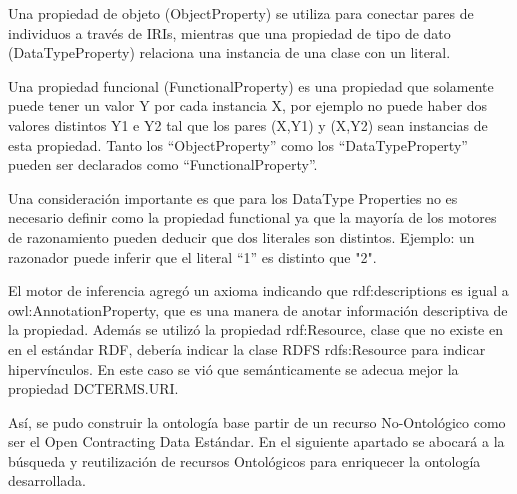 Una propiedad de objeto (ObjectProperty) se utiliza para conectar pares de individuos a través de IRIs, mientras que una propiedad de tipo de dato (DataTypeProperty) relaciona una instancia de una clase con un literal.

Una propiedad funcional (FunctionalProperty) es una propiedad que solamente puede tener un valor Y por cada instancia X, por ejemplo no puede haber dos valores distintos Y1 e Y2 tal que los pares (X,Y1) y (X,Y2) sean instancias de esta propiedad. Tanto los “ObjectProperty” como los “DataTypeProperty” pueden ser declarados como “FunctionalProperty”.


Una consideración importante es que para los DataType Properties no es necesario definir como la propiedad functional ya que la mayoría de los motores de razonamiento pueden deducir que dos literales son distintos. Ejemplo: un razonador puede inferir que  el literal “1” es distinto que  "2".

El motor de inferencia agregó un axioma indicando que rdf:descriptions es igual a owl:AnnotationProperty, que es una manera de anotar información descriptiva de la propiedad. Además se utilizó la propiedad rdf:Resource, clase que no existe en en el estándar RDF, debería indicar la clase RDFS rdfs:Resource para indicar hipervínculos. En este caso se vió que semánticamente se adecua mejor la propiedad DCTERMS.URI.

Así, se pudo construir la ontología base partir de un recurso No-Ontológico como ser el Open Contracting Data Estándar. En el siguiente apartado se abocará a la búsqueda y reutilización de recursos Ontológicos para enriquecer la ontología desarrollada.
